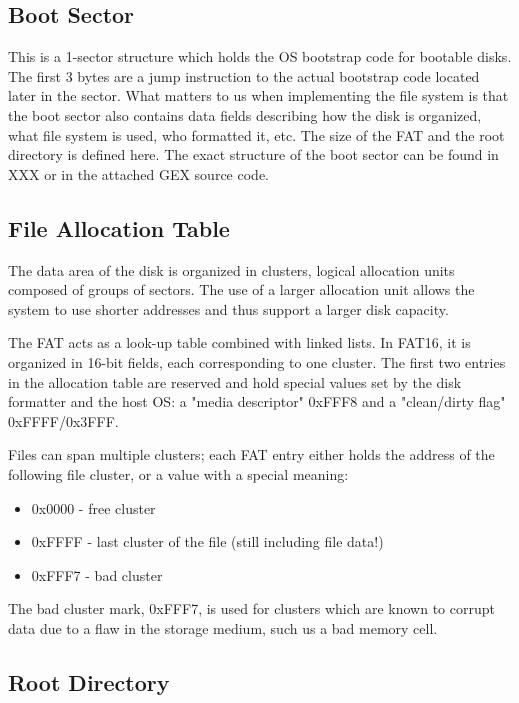 \subsection{Boot Sector}

This is a 1-sector structure which holds the \gls{OS} bootstrap code for bootable disks. The first 3 bytes are a jump instruction to the actual bootstrap code located later in the sector. What matters to us when implementing the file system is that the boot sector also contains data fields describing how the disk is organized, what file system is used, who formatted it, etc. The size of the \gls{FAT} and the root directory is defined here. The exact structure of the boot sector can be found in XXX or in the attached GEX source code.

\subsection{File Allocation Table}

The data area of the disk is organized in clusters, logical allocation units composed of groups of sectors. The use of a larger allocation unit allows the system to use shorter addresses and thus support a larger disk capacity.

The \gls{FAT} acts as a look-up table combined with linked lists. In FAT16, it is organized in 16-bit fields, each corresponding to one cluster. The first two entries in the allocation table are reserved and hold special values set by the disk formatter and the host \gls{OS}: a "media descriptor" 0xFFF8 and a "clean/dirty flag" 0xFFFF/0x3FFF. 

Files can span multiple clusters; each \gls{FAT} entry either holds the address of the following file cluster, or a value with a special meaning:

\begin{itemize}
	\item 0x0000 - free cluster
	\item 0xFFFF - last cluster of the file (still including file data!)
	\item 0xFFF7 - bad cluster
\end{itemize}

The bad cluster mark, 0xFFF7, is used for clusters which are known to corrupt data due to a flaw in the storage medium, such us a bad memory cell.

\subsection{Root Directory}

